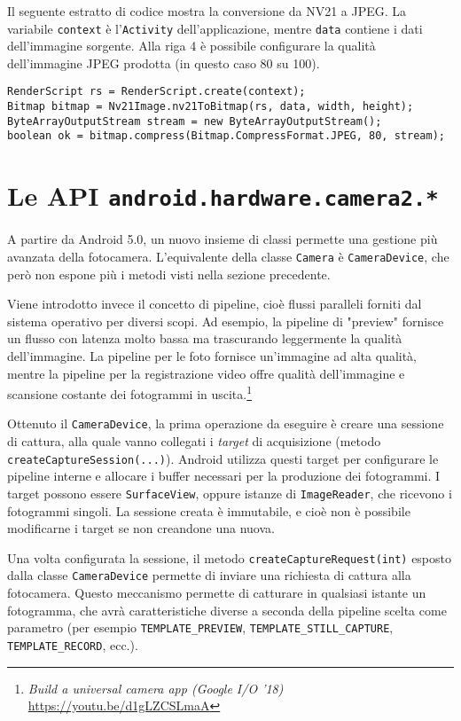 Il seguente estratto di codice mostra la conversione da NV21 a JPEG. La variabile \texttt{context} è l'\texttt{Activity} dell'applicazione, mentre \texttt{data} contiene i dati dell'immagine sorgente. Alla riga 4 è possibile configurare la qualità dell'immagine JPEG prodotta (in questo caso 80 su 100).

\begin{verbatim}
RenderScript rs = RenderScript.create(context);
Bitmap bitmap = Nv21Image.nv21ToBitmap(rs, data, width, height);
ByteArrayOutputStream stream = new ByteArrayOutputStream();
boolean ok = bitmap.compress(Bitmap.CompressFormat.JPEG, 80, stream);
\end{verbatim}


\section{Le API \texttt{android.hardware.camera2.*}}
\label{sec:hdmi_camera2}

A partire da Android 5.0, un nuovo insieme di classi permette una gestione più avanzata della fotocamera. L'equivalente della classe \texttt{Camera} è \texttt{CameraDevice}, che però non espone più i metodi visti nella sezione precedente.

Viene introdotto invece il concetto di pipeline, cioè flussi paralleli forniti dal sistema operativo per diversi scopi. Ad esempio, la pipeline di "preview" fornisce un flusso con latenza molto bassa ma trascurando leggermente la qualità dell'immagine. La pipeline per le foto fornisce un'immagine ad alta qualità, mentre la pipeline per la registrazione video offre qualità dell'immagine e scansione costante dei fotogrammi in uscita.\footnote{\emph{Build a universal camera app (Google I/O '18)} \url{https://youtu.be/d1gLZCSLmaA}}

Ottenuto il \texttt{CameraDevice}, la prima operazione da eseguire è creare una sessione di cattura, alla quale vanno collegati i \emph{target} di acquisizione (metodo \texttt{createCaptureSession(...)}). Android utilizza questi target per configurare le pipeline interne e allocare i buffer necessari per la produzione dei fotogrammi.\cite{camera2} I target possono essere \texttt{SurfaceView}, oppure istanze di \texttt{ImageReader}, che ricevono i fotogrammi singoli. La sessione creata è immutabile, e cioè non è possibile modificarne i target se non creandone una nuova.

Una volta configurata la sessione, il metodo \texttt{createCaptureRequest(int)} esposto dalla classe \texttt{CameraDevice} permette di inviare una richiesta di cattura alla fotocamera. Questo meccanismo permette di catturare in qualsiasi istante un fotogramma, che avrà caratteristiche diverse a seconda della pipeline scelta come parametro (per esempio \texttt{TEMPLATE\_PREVIEW}, \texttt{TEMPLATE\_STILL\_CAPTURE}, \texttt{TEMPLATE\_RECORD}, ecc.).

